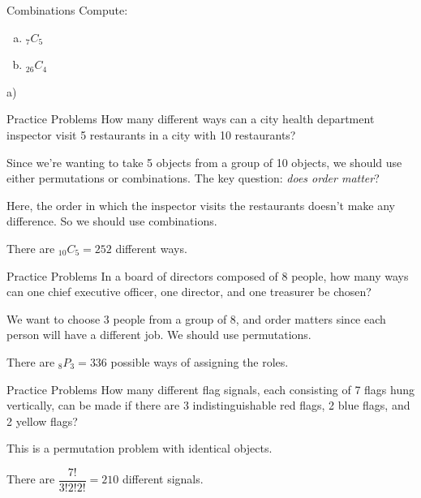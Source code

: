 \documentclass[t, aspectratio=169]{beamer}
\newcommand{\?}{\stackrel{?}{=}}
\begin{document}
	\begin{frame}{Combinations}
		Compute: \begin{enumerate}[a)]
			\item $_7 C _5$
			\item $_{26} C _4$
		\end{enumerate}
		a) \begin{flalign*}
		\end{flalign*}
	\end{frame}

	\begin{frame}{Practice Problems}
		How many different ways can a city health department inspector visit 5 restaurants in a city with 10 restaurants? \pause
		
		Since we're wanting to take 5 objects from a group of 10 objects, we should use either permutations or combinations. The key question: \textit{does order matter}? \pause
		
		Here, the order in which the inspector visits the restaurants doesn't make any difference. So we should use combinations. \pause
		
		There are $_{10} C _5 = 252$ different ways.
	\end{frame}

	\begin{frame}{Practice Problems}
		In a board of directors composed of 8 people, how many ways can one chief executive officer, one director, and one treasurer be chosen? \pause
		
		We want to choose 3 people from a group of 8, and order matters since each person will have a different job. We should use permutations. \pause
		
		There are $_8 P _3 = 336$ possible ways of assigning the roles.
	\end{frame}

	\begin{frame}{Practice Problems}
		How many different flag signals, each consisting of 7 flags hung vertically, can be made if there are 3 indistinguishable red flags, 2 blue flags, and 2 yellow flags? \pause
		
		This is a permutation problem with identical objects. \pause
		
		There are $\dfrac{7!}{3!2!2!} = 210$ different signals.
	\end{frame}
\end{document}
